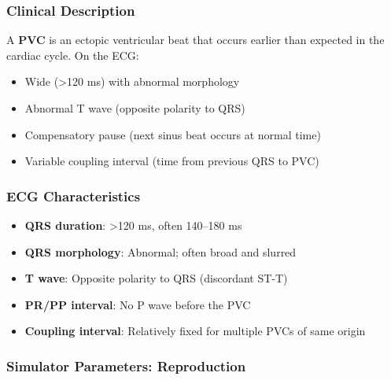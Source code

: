 \documentclass[12pt,a4paper,oneside]{book}
\begin{document}
\subsubsection{Clinical Description}

A \textbf{PVC} is an ectopic ventricular beat that occurs earlier than expected in the cardiac cycle. On the ECG:

\begin{itemize}
    \item Wide \QRS (>120 ms) with abnormal morphology
    \item Abnormal T wave (opposite polarity to QRS)
    \item Compensatory pause (next sinus beat occurs at normal time)
    \item Variable coupling interval (time from previous QRS to PVC)
\end{itemize}

\subsubsection{ECG Characteristics}

\begin{itemize}
    \item \textbf{QRS duration}: >120 ms, often 140–180 ms
    \item \textbf{QRS morphology}: Abnormal; often broad and slurred
    \item \textbf{T wave}: Opposite polarity to QRS (discordant ST-T)
    \item \textbf{PR/PP interval}: No P wave before the PVC
    \item \textbf{Coupling interval}: Relatively fixed for multiple PVCs of same origin
\end{itemize}

\subsubsection{Simulator Parameters: Reproduction}
\end{document}
